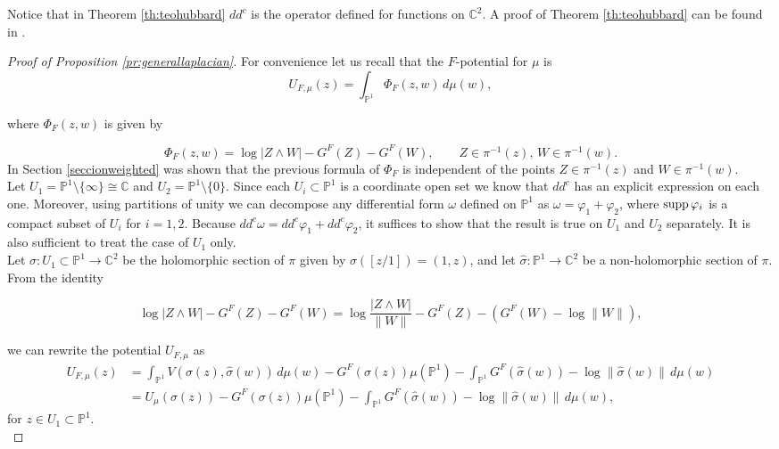 Notice that in Theorem \ref{th:teohubbard} $dd^c$ is the operator defined for functions on $\mathbb{C}^2$. A proof of Theorem \ref{th:teohubbard} can be found in \cite[Theorem 4.1]{hubbard}.\\

\begin{proof}[Proof of Proposition \ref{pr:generallaplacian}]
For convenience let us recall that the $F$-potential for $\mu$ is
$$U_{F,\mu} (z) = \int_{\mathbb{P}^1} \Phi_F(z,w)\,d\mu(w),$$

where $\Phi_F(z,w)$ is given by

$$\Phi_F(z,w) = \log |Z\wedge W| -G^F(Z)-G^F(W), \qquad Z\in \pi^{-1}(z),\,W\in \pi^{-1}(w).$$
In Section \ref{seccionweighted} was shown that the previous formula of $\Phi_F$ is independent of the points $Z\in \pi^{-1}(z)$ and $W\in \pi^{-1}(w)$.\\

Let $U_1=\mathbb{P}^1 \setminus \{\infty\}\cong \mathbb{C}$ and $U_2 = \mathbb{P}^1\setminus\{0\}$. Since each $U_i\subset \mathbb{P}^1$ is a coordinate open set we know that $dd^c$ has an explicit expression on each one. Moreover, using partitions of unity we can decompose any differential form $\omega$ defined on $\mathbb{P}^1$ as $\omega = \varphi_1+\varphi_2$, where $\text{supp}\, \varphi_i$ is a compact subset of $U_i$ for $i=1,2$. Because $dd^c\omega = dd^c\varphi_1+dd^c\varphi_2$, it suffices to show that the result is true on $U_1$ and $U_2$ separately. It is also sufficient to treat the case of $U_1$ only.\\

Let $\sigma:U_1\subset \mathbb{P}^1 \rightarrow \mathbb{C}^2$ be the holomorphic section of $\pi$ given by $\sigma([z/1])=(1,z)$, and let $\widehat{\sigma}:\mathbb{P}^1 \rightarrow \mathbb{C}^2$ be a non-holomorphic section of $\pi$. From the identity

$$\log |Z\wedge W| -G^F(Z)-G^F(W) = \log \frac{|Z\wedge W|}{\|W\|}-G^F(Z)-(G^F(W)-\log\|W\|),$$
 
we can rewrite the potential $U_{F,\mu}$ as
\begin{align*}
U_{F,\mu}(z) &= \int_{\mathbb{P}^1}V(\sigma(z),\widehat{\sigma}(w)) \,d\mu(w) -G^F(\sigma(z))\mu(\mathbb{P}^1)-\int_{\mathbb{P}^1}G^F(\widehat{\sigma}(w))-\log\|\widehat{\sigma}(w)\| \,d\mu(w)\\
&= U_{\mu}(\sigma (z))-G^F(\sigma(z))\mu(\mathbb{P}^1)-\int_{\mathbb{P}^1}G^F(\widehat{\sigma}(w))-\log\|\widehat{\sigma}(w)\| \,d\mu(w),
\end{align*}
for $z\in U_1\subset \mathbb{P}^1$.\\


\end{proof}
